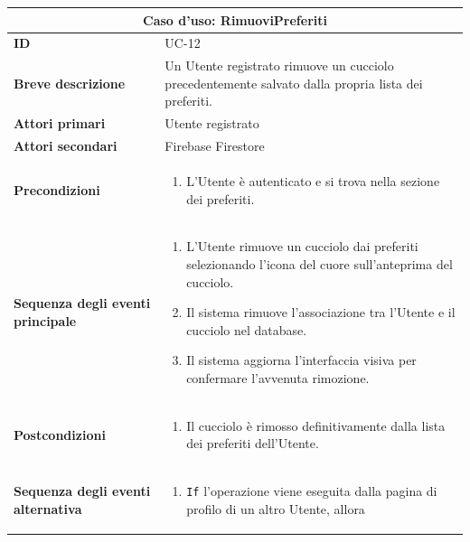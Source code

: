 \documentclass[a4paper]{report}
\begin{document}
\begin{table}[H]
\vspace*{-0cm}
\renewcommand{\arraystretch}{1.9}
\begin{tabular}{|p{3.9cm}|p{9.9cm}|}
\hline
\multicolumn{2}{|c|}{\textbf{Caso d’uso: RimuoviPreferiti}} \\ \hline
\textbf{ID} & UC-12 \\ \hline
\textbf{Breve descrizione} & Un Utente registrato rimuove un cucciolo precedentemente salvato dalla propria lista dei preferiti. \\ \hline
\textbf{Attori primari} & Utente registrato \\ \hline
\textbf{Attori secondari} & Firebase Firestore \\ \hline
\textbf{Precondizioni} & \begin{enumerate}[leftmargin=14pt,label=\arabic*.,labelsep=0.5em,topsep=0pt,partopsep=0pt,parsep=0pt,itemsep=0pt]
    \item L'Utente è autenticato e si trova nella sezione dei preferiti.
\end{enumerate} \\ \hline
\textbf{Sequenza degli eventi principale} &
\begin{enumerate}[leftmargin=14pt,label=\arabic*.,labelsep=0.5em,topsep=0pt,partopsep=0pt,parsep=0pt,itemsep=0pt]
   \item L'Utente rimuove un cucciolo dai preferiti selezionando l'icona del cuore sull'anteprima del cucciolo.
   \item Il sistema rimuove l'associazione tra l'Utente e il cucciolo nel database.
   \item Il sistema aggiorna l'interfaccia visiva per confermare l'avvenuta rimozione.
\end{enumerate}\\ \hline
\textbf{Postcondizioni} &
\begin{enumerate}[leftmargin=14pt,label=\arabic*.,labelsep=0.5em,topsep=0pt,partopsep=0pt,parsep=0pt,itemsep=0pt]
\item Il cucciolo è rimosso definitivamente dalla lista dei preferiti dell'Utente.
\end{enumerate} \\ \hline
\textbf{Sequenza degli eventi alternativa} & \begin{enumerate}[leftmargin=14pt,label=\arabic*.,labelsep=0.5em,topsep=0pt,partopsep=0pt,parsep=0pt,itemsep=0pt]
   \item \texttt{If} l'operazione viene eseguita dalla pagina di profilo di un altro Utente, allora

\end{enumerate}
\end{tabular}
\end{table}
\end{document}
